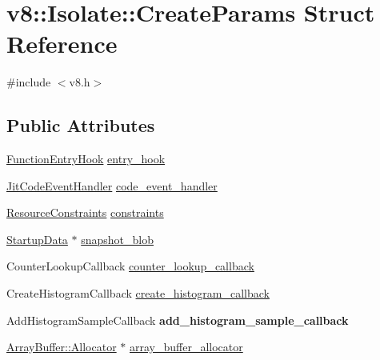 \hypertarget{structv8_1_1_isolate_1_1_create_params}{}\section{v8\+:\+:Isolate\+:\+:Create\+Params Struct Reference}
\label{structv8_1_1_isolate_1_1_create_params}


{\ttfamily \#include $<$v8.\+h$>$}

\subsection*{Public Attributes}
\begin{DoxyCompactItemize}
\item 
\hyperlink{namespacev8_aaf07fb6bb13f295da3c6568938b7dec5}{Function\+Entry\+Hook} \hyperlink{structv8_1_1_isolate_1_1_create_params_aa7aa18bbe2d86713e5b074a93b38dc60}{entry\+\_\+hook}
\item 
\hyperlink{namespacev8_a39243bc91e63d64d111452fdb98c4733}{Jit\+Code\+Event\+Handler} \hyperlink{structv8_1_1_isolate_1_1_create_params_a783e3eba90ce6e2800bdd69197bbccdd}{code\+\_\+event\+\_\+handler}
\item 
\hyperlink{classv8_1_1_resource_constraints}{Resource\+Constraints} \hyperlink{structv8_1_1_isolate_1_1_create_params_a2c570b306aa8c1c24cfe70e8eee50fa1}{constraints}
\item 
\hyperlink{classv8_1_1_startup_data}{Startup\+Data} $\ast$ \hyperlink{structv8_1_1_isolate_1_1_create_params_a25d38476e4dec79ae96c59292eee4a64}{snapshot\+\_\+blob}
\item 
Counter\+Lookup\+Callback \hyperlink{structv8_1_1_isolate_1_1_create_params_a10441abadd0b83a938303c92e7444fb6}{counter\+\_\+lookup\+\_\+callback}
\item 
Create\+Histogram\+Callback \hyperlink{structv8_1_1_isolate_1_1_create_params_a11acf5fb9cdbc4c8bf15baf542507b49}{create\+\_\+histogram\+\_\+callback}
\item 
Add\+Histogram\+Sample\+Callback {\bfseries add\+\_\+histogram\+\_\+sample\+\_\+callback}\hypertarget{structv8_1_1_isolate_1_1_create_params_a3e0fb886996eb1f498b6cc157e11e280}{}\label{structv8_1_1_isolate_1_1_create_params_a3e0fb886996eb1f498b6cc157e11e280}

\item 
\hyperlink{classv8_1_1_array_buffer_1_1_allocator}{Array\+Buffer\+::\+Allocator} $\ast$ \hyperlink{structv8_1_1_isolate_1_1_create_params_a7c663f70b64290392eeaf164f57585f9}{array\+\_\+buffer\+\_\+allocator}
\end{DoxyCompactItemize}


